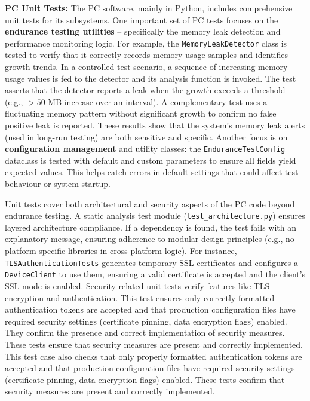 \textbf{PC Unit Tests:} The PC software, mainly in Python, includes comprehensive unit tests for its subsystems. One important set of PC tests focuses on the \textbf{endurance testing utilities} -- specifically the memory leak detection and performance monitoring logic. For example, the \texttt{MemoryLeakDetector} class is tested to verify that it correctly records memory usage samples and identifies growth trends. In a controlled test scenario, a sequence of increasing memory usage values is fed to the detector and its analysis function is invoked. The test asserts that the detector reports a leak when the growth exceeds a threshold (e.g., $>50$ MB increase over an interval). A complementary test uses a fluctuating memory pattern without significant growth to confirm no false positive leak is reported. These results show that the system's memory leak alerts (used in long-run testing) are both sensitive and specific. Another focus is on \textbf{configuration management} and utility classes: the \texttt{EnduranceTestConfig} dataclass is tested with default and custom parameters to ensure all fields yield expected values. This helps catch errors in default settings that could affect test behaviour or system startup.

Unit tests cover both architectural and security aspects of the PC code beyond endurance testing. A static analysis test module (\texttt{test\_architecture.py}) ensures layered architecture compliance. If a dependency is found, the test fails with an explanatory message, ensuring adherence to modular design principles (e.g., no platform-specific libraries in cross-platform logic). For instance, \texttt{TLSAuthenticationTests} generates temporary SSL certificates and configures a \texttt{DeviceClient} to use them, ensuring a valid certificate is accepted and the client's SSL mode is enabled. Security-related unit tests verify features like TLS encryption and authentication. This test ensures only correctly formatted authentication tokens are accepted and that production configuration files have required security settings (certificate pinning, data encryption flags) enabled. They confirm the presence and correct implementation of security measures. These tests ensure that security measures are present and correctly implemented. This test case also checks that only properly formatted authentication tokens are accepted and that production configuration files have required security settings (certificate pinning, data encryption flags) enabled. These tests confirm that security measures are present and correctly implemented.

